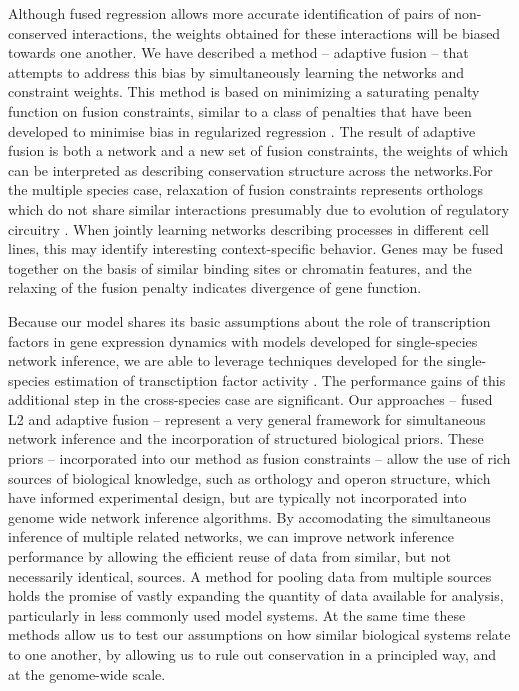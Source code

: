 \documentclass[11pt]{article}
\begin{document}
Although fused regression allows more accurate identification of pairs of non-conserved interactions, the weights obtained for these interactions will be biased towards one another. We have described a method -- adaptive fusion -- that attempts to address this bias by simultaneously learning the networks and constraint weights. This method is based on minimizing a saturating penalty function on fusion constraints, similar to a class of penalties that have been developed to minimise bias in regularized regression \cite{fan2001variable,zhang2010nearly}. 
The result of adaptive fusion is both a network and a new set of fusion constraints, the weights of which can be interpreted as describing conservation structure across the networks.For the multiple species case, relaxation of fusion constraints represents orthologs which do not share similar interactions presumably due to evolution of regulatory circuitry \cite{kellis_proof_2004}. %
When jointly learning networks describing processes in different cell lines, this may identify interesting context-specific behavior. Genes may be fused together on the basis of similar binding sites or chromatin features, and the relaxing of the fusion penalty indicates divergence of gene function. 

Because our model shares its basic assumptions about the role of transcription factors in gene expression dynamics with models developed for single-species network inference, we are able to leverage techniques developed for the single-species estimation of transctiption factor activity \cite{fu_reconstructing_2011}. 
The performance gains of this additional step in the cross-species case are significant.
Our approaches -- fused L2 and adaptive fusion -- represent a very general framework for simultaneous network inference and the incorporation of structured biological priors. 
These priors -- incorporated into our method as fusion constraints -- allow the use of rich sources of biological knowledge, such as orthology and operon structure, which have informed experimental design, but are typically not incorporated into genome wide network inference algorithms. 
By accomodating the simultaneous inference of multiple related networks, we can improve network inference performance by allowing the efficient reuse of data from similar, but not necessarily identical, sources. 
A method for pooling data from multiple sources holds the promise of vastly expanding the quantity of data available for analysis, particularly in less commonly used model systems. 
At the same time these methods allow us to test our assumptions on how similar biological systems relate to one another, by allowing us to rule out conservation in a principled way, and at the genome-wide scale. 
\end{document}
